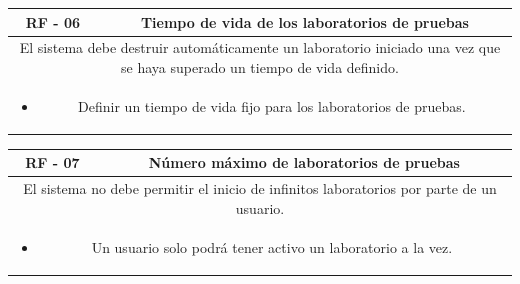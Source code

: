                 \begin{table}[!htbp]
                    \centering

                    \begin{tabular}{|c|c|}
                        \hline
                        \textbf{RF - 06} & \textbf{Tiempo de vida de los laboratorios de pruebas} \\
                        \hline
                        \multicolumn{2}{|p{15cm}|}{
                            El sistema debe destruir automáticamente un laboratorio iniciado una vez que se haya superado un tiempo de vida definido.
                        } \\
                        \hline
                        \multicolumn{2}{|p{15cm}|}{
                            \begin{itemize}
                                \item Definir un tiempo de vida fijo para los laboratorios de pruebas.
                            \end{itemize}
                            } \\
                        \hline
                    \end{tabular}

                    \label{tab:RF06}
                \end{table}
                
                \begin{table}[!htbp]
                    \centering

                    \begin{tabular}{|c|c|}
                        \hline
                        \textbf{RF - 07} & \textbf{Número máximo de laboratorios de pruebas} \\
                        \hline
                        \multicolumn{2}{|p{15cm}|}{
                            El sistema no debe permitir el inicio de infinitos laboratorios por parte de un usuario.
                        } \\
                        \hline
                        \multicolumn{2}{|p{15cm}|}{
                            \begin{itemize}
                                \item Un usuario solo podrá tener activo un laboratorio a la vez.
                            \end{itemize}
                            } \\
                        \hline
                    \end{tabular}

                    \label{tab:RF07}
                \end{table}
                
